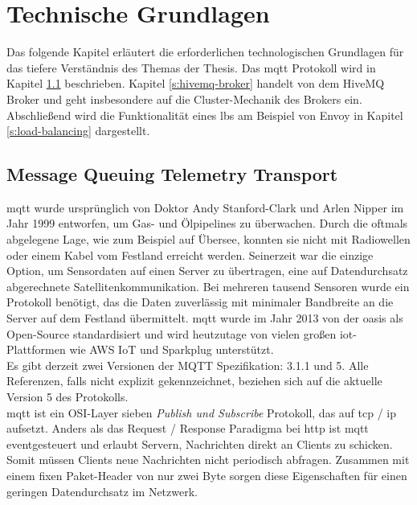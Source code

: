 \section{Technische Grundlagen} \label{s:basics}
Das folgende Kapitel erläutert die erforderlichen technologischen Grundlagen für das tiefere Verständnis des Themas der Thesis.
Das \acs{mqtt} Protokoll wird in Kapitel \ref{s:mqtt} beschrieben.
Kapitel \ref{s:hivemq-broker} handelt von dem HiveMQ Broker und geht insbesondere auf die Cluster-Mechanik des Brokers ein.
Abschlie{\ss}end wird die Funktionalität eines \aclp{lb} am Beispiel von Envoy in Kapitel \ref{s:load-balancing} dargestellt.

\subsection{Message Queuing Telemetry Transport} \label{s:mqtt}
\acf{mqtt} wurde ursprünglich von Doktor Andy Stanford-Clark und Arlen Nipper im Jahr 1999 entworfen, um Gas- und Ölpipelines zu überwachen.
Durch die oftmals abgelegene Lage, wie zum Beispiel auf Übersee, konnten sie nicht mit Radiowellen oder einem Kabel vom Festland erreicht werden. Seinerzeit war die einzige Option, um Sensordaten auf einen Server zu übertragen, eine auf Datendurchsatz abgerechnete Satellitenkommunikation. Bei mehreren tausend Sensoren wurde ein Protokoll benötigt, das die Daten zuverlässig mit minimaler Bandbreite an die Server auf dem Festland übermittelt.
\ac{mqtt} wurde im Jahr 2013 von der \ac{oasis} als Open-Source standardisiert und wird heutzutage von vielen gro{\ss}en \ac{iot}-Plattformen wie AWS IoT und Sparkplug unterstützt.
\cite{WhatMQTTDefinition}\\
Es gibt derzeit zwei Versionen der MQTT Spezifikation: 3.1.1 und 5. Alle Referenzen, falls nicht explizit gekennzeichnet, beziehen sich auf die aktuelle Version 5 des Protokolls.\\
\ac{mqtt} ist ein OSI-Layer sieben \textit{Publish und Subscribe} Protokoll, das auf \acs{tcp} / \acs{ip} aufsetzt. Anders als das Request / Response Paradigma bei \acs{http} ist \ac{mqtt} eventgesteuert und erlaubt Servern, Nachrichten direkt an Clients zu schicken.
Somit müssen Clients neue Nachrichten nicht periodisch abfragen. Zusammen mit einem fixen Paket-Header von nur zwei Byte sorgen diese Eigenschaften für einen geringen Datendurchsatz im Netzwerk.\cite{WhatMQTTDefinition}

